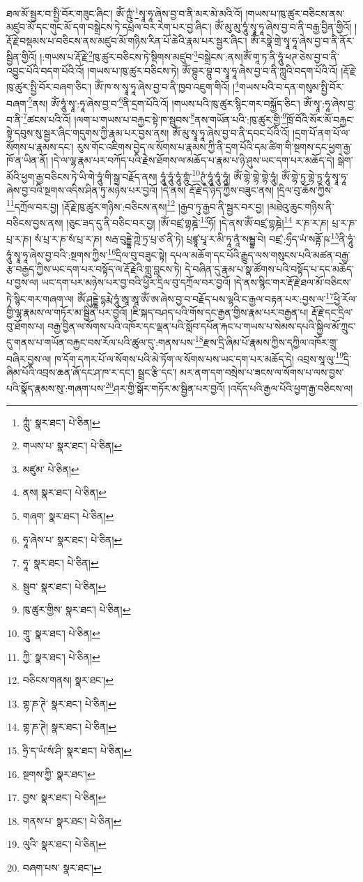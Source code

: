 ཐལ་མོ་སྦྱར་བ་སྤྱི་བོར་གཟུང་ཞིང་། ཨོཾ་ཀྵུཾ་\footnote{ཀླུཾ་  སྣར་ཐང་།  པེ་ཅིན། }སྭཱ་ཧཱ་ཞེས་བྱ་བ་ནི་མར་མེ་མའི་འོ། །གཡས་པ་ཁུ་ཚུར་བཅིངས་ནས་མཛུབ་མོ་དང་གུང་མོ་དག་བསྒྲེངས་ཏེ་དཔྲལ་བར་རེག་པར་བྱ་ཞིང་། ཨོཾ་མུ་མུ་ཧཱུཾ་སྭཱ་ཧཱ་ཞེས་བྱ་བ་ནི་བརྒྱ་བྱིན་གྱིའོ། །རྡོ་རྗེ་བསྡམས་པ་བཅིངས་ནས་མཛུབ་མོ་གཉིས་རིན་པོ་ཆེའི་རྣམ་པར་སྦྱར་ཞིང་། ཨོཾ་རཏྣེ་གྲེ་སྭཱ་ཧཱ་ཞེས་བྱ་བ་ནི་ནོར་སྦྱིན་གྱིའོ། །:གཡས་པ་རྡོ་རྗེ་\footnote{གཡས་པ་  སྣར་ཐང་།  པེ་ཅིན། }ཁུ་ཚུར་བཅིངས་ཏེ་སྡིགས་མཛུབ་\footnote{མཛུམ་  པེ་ཅིན། }བསྒྲེངས་:ནས།ཨོཾ་གཱ་ཏ་ནི་ཧཱུཾ་ཕཊ་ཅེས་བྱ་བ་ནི་འབྱུང་པོའི་བདག་པོའི་འོ། །གཡས་པ་ཁུ་ཚུར་བཅིངས་ཏེ། ཨོཾ་བྷུར་བྷུ་བ་སྭཱ་ཧཱ་ཞེས་བྱ་བ་ནི་ཀླུའི་བདག་པོའི་འོ། །རྡོ་རྗེ་ཁུ་ཚུར་སྤྱི་བོར་བཞག་ཅིང་། ཨོཾ་ཁ་ས་སྭཱ་ཧཱ་ཞེས་བྱ་བ་ནི་ཁྱབ་འཇུག་གིའོ། །\footnote{ནས།  སྣར་ཐང་།  པེ་ཅིན། }གཡས་པའི་བ་དན་གསུམ་སྤྱི་བོར་བཞག་\footnote{གཞག་  སྣར་ཐང་།  པེ་ཅིན། }ནས། ཨོཾ་ཧཱུཾ་སྭཱ་:ཧཱ་ཞེས་བྱ་བ་\footnote{ཧཱ་ཞེས་པ་  སྣར་ཐང་།  པེ་ཅིན། }ནི་དྲག་པོའི་འོ། །གཡས་པའི་ཁུ་ཚུར་སྙིང་གར་བསྐྱོད་ཅིང་། ཨོཾ་སྭཱ་:ཧཱ་ཞེས་བྱ་བ་ནི་\footnote{ཧཱ་  སྣར་ཐང་།  པེ་ཅིན། }ཚངས་པའི་འོ། །ལག་པ་གཡས་པ་བརྐྱང་སྟེ་ཁ་སྦུབས་\footnote{སྦུབ་  སྣར་ཐང་།  པེ་ཅིན། }ནས་གཡོན་པའི་:ཁུ་ཚུར་གྱི་\footnote{ཁུ་ཚུར་གྱིས་  སྣར་ཐང་།  པེ་ཅིན། }ཁྲོ་བོའི་སོར་མོ་བརྐྱང་སྟེ་དབུས་སུ་སྦྱར་ཞིང་གདུགས་ཀྱི་རྣམ་པར་བྱས་ནས། ཨོཾ་མུ་སྭཱ་ཧཱ་ཞེས་བྱ་བ་ནི་དབང་པོའི་འོ། །དྲག་པོ་ནག་པོ་ལ་སོགས་པ་རྣམས་དང་། རུས་གོང་འཇིགས་བྱེད་ལ་སོགས་པ་རྣམས་ཀྱི་ནི་དྲག་པོའི་དམ་ཚིག་གི་སྔགས་དང་ཕྱག་རྒྱ་ཁོ་ན་ཡིན་ནོ། །དེ་ལ་ལྷ་རྣམ་པར་བཀོད་པའི་རྗེས་ཐོགས་ལ་མཆོད་པ་རྣམ་པ་ཉི་ཤུས་ཡང་དག་པར་མཆོད་དེ། སྒེག་མོའི་ཕྱག་རྒྱ་བཅིངས་ཏེ་ཡི་གེ་ཧཱུཾ་གི་སྒྲ་བརྗོད་ནས། ཧཱུཾ་ཧཱུཾ་ཧཱུཾ་གྷུཾ་\footnote{གཱུ་  སྣར་ཐང་།  པེ་ཅིན། }ཊུཾ་ཧཱུཾ་ཧཱུཾ་ཧཱུཾ། ཨོཾ་གྷེ་གྷེ་གྷེ་ཧཱུཾ། ཨོཾ་གྷེ་ཏྱ་གྷེ་ཏྱ་ཧཱུཾ་སྭཱ་ཧཱ་ཞེས་བྱ་བའི་སྔགས་འདིས་ཤིན་ཏུ་མཉེས་པར་བྱའོ། །དེ་ནས། རྡོ་རྗེ་དེ་ཉིད་ཀྱིས་བཟུང་ནས། །དྲིལ་བུ་ཆོས་ཀྱིས་\footnote{ཀྱི་  སྣར་ཐང་།  པེ་ཅིན། }དཀྲོལ་བར་བྱ། །རྡོ་རྗེ་ཁུ་ཚུར་གཉིས་:བཅིངས་ནས།\footnote{བཅིངས་གནས།  སྣར་ཐང་། } །རྒྱབ་ཏུ་རྒྱབ་ནི་སྦྱར་བར་བྱ། །མཐེའུ་ཆུང་གཉིས་ནི་བཅིངས་བྱས་ནས། །ཅུང་ཟད་དུ་ནི་བཅིང་བར་བྱ། །ཨོཾ་བཛྲ་གྷཎྜེ་\footnote{གྷ་ཎ་ཊེ་  སྣར་ཐང་།  པེ་ཅིན། }ཧོ། །དེ་ནས་ཨོཾ་བཛྲ་གྷཎྜེ།\footnote{གྷ་ཎ་ཊེ།  སྣར་ཐང་།  པེ་ཅིན། } ར་ཎ་ར་ཎ། པྲ་ར་ཎ་པྲ་ར་ཎ། སཾ་པྲ་ར་ཎ་སཾ་པྲ་ར་ཎ། སརྦ་བུདྡྷེ་ཀྵེ་ཏྲ་པྲ་ཙ་ནི་ཏེ། པྲཛྙཱ་པཱ་ར་མི་ཏཱ་ནཱཾ་སམྦྷ་བེ། བཛྲ་:ཧྲྀད་ཡཾ་སནྟོ་ཥ་\footnote{ཧྲི་ད་ཡཾ་སཾ་ཤི་  སྣར་ཐང་།  པེ་ཅིན། }ནི་ཧཱུཾ་ཧཱུཾ་སྭཱ་ཧཱ་ཞེས་བྱ་བའི་:སྔགས་ཀྱིས་\footnote{སྔགས་ཀྱི་  སྣར་ཐང་། }དྲིལ་བུ་བཟུང་སྟེ། དཔལ་མཆོག་དང་པོའི་རྒྱུད་ལས་གསུངས་པའི་མཚན་བརྒྱ་རྩ་བརྒྱད་ཀྱིས་ཡང་དག་པར་བསྟོད་ལ་རྡོ་རྗེའི་གླུ་བླངས་ཏེ། དེ་བཞིན་དུ་རྣམ་པ་སྣ་ཚོགས་པའི་བསྟོད་པ་དང་མཆོད་པ་བྱས་ལ། ཡང་དག་པར་མཉེས་པར་བྱ་བའི་ཕྱིར་དྲིལ་བུ་དཀྲོལ་བར་བྱའོ། །དེ་ནས་སྙིང་གར་རྡོ་རྗེ་ཐལ་མོ་བཅིངས་ཏེ་སྙིང་གར་གཞག་ལ། ཨོཾ་ཤུདྡྷེ་དྷརྨེ་ཧཱུཾ་ཨཱ་ཨཱ་ཨོཾ་ཨ་ཞེས་བྱ་བ་བརྗོད་པས་ལྷའི་ང་རྒྱལ་བརྟན་པར་:བྱས་ལ་\footnote{བྱས་  སྣར་ཐང་།  པེ་ཅིན། }ཕྱི་རོལ་གྱི་ལྷ་རྣམས་ལ་གཏོར་མ་སྦྱིན་པར་བྱའོ། །ཇི་སྐད་བཤད་པའི་གོས་དང་རྒྱན་གྱིས་རྣམ་པར་བརྒྱན་པ། རྡོ་རྗེ་དང་དྲིལ་བུ་ཐོགས་པ། བརྒྱ་བྱིན་ལ་སོགས་པའི་འཁོར་དང་ལྡན་པའི་སློབ་དཔོན་རྐང་པ་གཡས་པ་སེམས་དཔའི་སྐྱིལ་མོ་ཀྲུང་དུ་གནས་པ་གཡོན་བརྐྱང་བས་རོལ་པའི་ཚུལ་དུ་:གནས་པས་\footnote{གནས་པ་  སྣར་ཐང་།  པེ་ཅིན། }རྫས་དྲི་ཞིམ་པོ་རྣམས་ཀྱིས་དཀྱིལ་འཁོར་གྲུ་བཞིར་བྱས་ལ། ཁ་དོག་དཀར་པོ་ལ་སོགས་པའི་མེ་ཏོག་ལ་སོགས་པས་ཡང་དག་པར་མཆོད་དེ། འབྲས་སཱ་ལུ་\footnote{ལུའི་  སྣར་ཐང་།  པེ་ཅིན། }དྲི་ཞིམ་པོའི་འབྲས་ཆན་ཞོ་དང་ཤ་ཁ་ར་དང་། སྦྲང་རྩི་དང་། མར་ནག་དག་བསྲེས་པ་ཟངས་ལ་སོགས་པ་ལས་བྱས་པའི་སྣོད་རྣམས་སུ་:གཞག་པས་\footnote{བཞག་པས་  སྣར་ཐང་། }ཤར་གྱི་སྒོར་གཏོར་མ་སྦྱིན་པར་བྱའོ། །འདོད་པའི་རྒྱལ་པོའི་ཕྱག་རྒྱ་བཅིངས་ལ། 